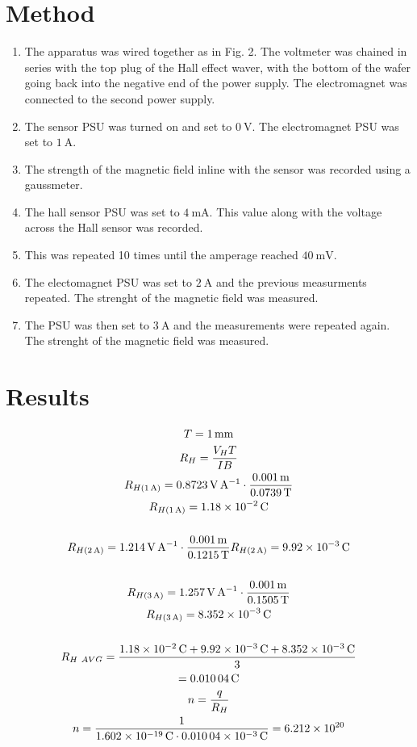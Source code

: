 \documentclass{article}
\begin{document}
    \section{Method}
        \begin{enumerate}
            \item The apparatus was wired together as in Fig. 2. The voltmeter was chained in series with the top plug of the Hall effect waver, with the bottom of the wafer going back into the negative end of the power supply. The electromagnet was connected to the second power supply.
            \item The sensor PSU was turned on and set to $\qty{0}{\V}$. The electromagnet PSU was set to $\qty{1}{\A}$. 
            \item The strength of the magnetic field inline with the sensor was recorded using a gaussmeter.
            \item The hall sensor PSU was set to $\qty{4}{\mA}$. This value along with the voltage across the Hall sensor was recorded.
            \item This was repeated 10 times until the amperage reached $\qty{40}{\mV}$.
            \item The electomagnet PSU was set to $\qty{2}{\A}$ and the previous measurments repeated. The strenght of the magnetic field was measured.
            \item The PSU was then set to $\qty{3}{\A}$ and the measurements were repeated again. The strenght of the magnetic field was measured.
        \end{enumerate}
    \section{Results}
        \begin{gather*}
            T = \qty{1}{\mm} \\
            R_H = \frac {V_H T}{I B} \\
            R_{H(\qty{1}{\A})} = \qty{0.8723}{\V\per\A} \cdot \frac {\qty{0.001}{\m}}{\qty{0.0739}{\T}} \\
            R_{H (\qty{1}{\A})} = \qty{1.18E-2}{\C} \\~\\
            R_{H(\qty{2}{\A})} = \qty{1.214}{\V\per\A} \cdot \frac {\qty{0.001}{\m}}{\qty{0.1215}{\T}}
            R_{H (\qty{2}{\A})} =\qty{9.92E-3}{\C} \\~\\
            R_{H(\qty{3}{\A})} = \qty{1.257}{\V\per\A} \cdot \frac {\qty{0.001}{\m}}{\qty{0.1505}{\T}} \\
            R_{H(\qty{3}{\A})} = \qty{8.352E-3}{\C} \\~\\
            R_{H \ AVG} = \frac {\qty{1.18E-2}{\C} + \qty{9.92E-3}{\C} + \qty{8.352E-3}{\C}} 3\\
            = \qty{0.01004}{\C} \\
            n = \frac {q}{R_H} \\
            n = \frac 1 {\qty{1.602E-19}{\C}\cdot \qty{0.01004E-3}{\C}} = \num{6.212E20}
        \end{gather*}
\end{document}
